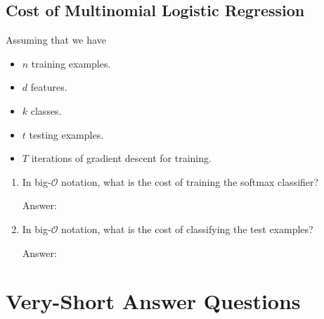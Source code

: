 \documentclass{article}
\def\ans#1{\par\gre{Answer: #1}}
\def\blu#1{{\color{blu}#1}}
\def\gre#1{{\color{gre}#1}}
\def\items#1{\begin{itemize}#1\end{itemize}}
\def\enum#1{\begin{enumerate}#1\end{enumerate}}
\begin{document}
\pagebreak

\subsection{Cost of Multinomial Logistic Regression}

Assuming that we have
\items{
\item $n$ training examples.
\item $d$ features.
\item $k$ classes.
\item $t$ testing examples.
\item $T$ iterations of gradient descent for training.
}
\blu{\enum{
\item In big-$\mathcal{O}$ notation, what is the cost of training the softmax classifier?
\ans{}
\item In big-$\mathcal{O}$ notation, what is the cost of classifying the test examples?
\ans{}
}}

\pagebreak

\section{Very-Short Answer Questions}
\end{document}
